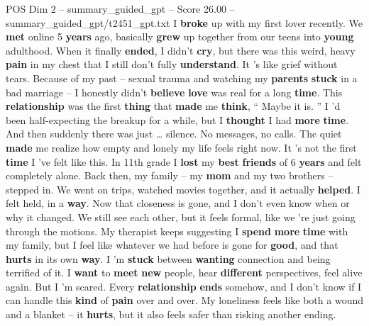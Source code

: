 \begin{textsample}{POS Dim 2 – summary\_guided\_gpt – Score 26.00 – summary\_guided\_gpt/t2451\_gpt.txt}  \label{ex:f2_pos_003}
I \textbf{broke} up with my first lover recently.
We \textbf{met} online 5 \textbf{years} ago, basically \textbf{grew} up together from our teens into \textbf{young} adulthood.
When it finally \textbf{ended}, I didn't \textbf{cry}, but there was this weird, heavy \textbf{pain} in my chest that I still don't fully \textbf{understand}.
It ’s like grief without tears.
Because of my past – sexual trauma and watching my \textbf{parents} \textbf{stuck} in a bad marriage – I honestly didn't \textbf{believe} \textbf{love} was real for a long \textbf{time}.
This \textbf{relationship} was the first \textbf{thing} that \textbf{made} me \textbf{think}, “ Maybe it is. ” I ’d been half-expecting the breakup for a while, but I \textbf{thought} I had \textbf{more} \textbf{time}.
And then suddenly there was just … silence.
No messages, no calls.
The quiet \textbf{made} me realize how empty and lonely my life feels right now.
It ’s not the first \textbf{time} I ’ve felt like this.
In 11th grade I \textbf{lost} my \textbf{best} \textbf{friends} of 6 \textbf{years} and felt completely alone.
Back then, my family – my \textbf{mom} and my two brothers – stepped in.
We went on trips, watched movies together, and it actually \textbf{helped}.
I felt held, in a \textbf{way}.
Now that closeness is gone, and I don't even know when or why it changed.
We still see each other, but it feels formal, like we ’re just going through the motions.
My therapist keeps suggesting I \textbf{spend} \textbf{more} \textbf{time} with my family, but I feel like whatever we had before is gone for \textbf{good}, and that \textbf{hurts} in its own \textbf{way}.
I ’m \textbf{stuck} between \textbf{wanting} connection and being terrified of it.
I \textbf{want} to \textbf{meet} \textbf{new} people, hear \textbf{different} perspectives, feel alive again.
But I ’m scared.
Every \textbf{relationship} \textbf{ends} somehow, and I don't know if I can handle this \textbf{kind} of \textbf{pain} over and over.
My loneliness feels like both a wound and a blanket – it \textbf{hurts}, but it also feels safer than risking another ending.

\end{textsample}
